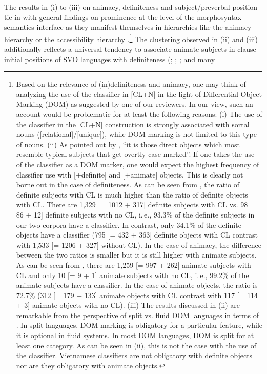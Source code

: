 \documentclass[output=paper]{langsci/langscibook}
\begin{document}
The results in (i) to (iii) on animacy, definiteness and subject/preverbal position tie in with general findings on prominence at the level of the morphosyntax-semantics interface as they manifest themselves in hierarchies like the animacy hierarchy \citep{silverstein:76,dixon:79} or the accessibility hierarchy \citep{keenan:comrie:77} \citep[for a survey, cf.][]{bornkessel:schlesewsky:09}.\footnote{Based on the relevance of (in)definiteness and animacy, one may think of analyzing the use of the classifier in [CL+N] in the light of Differential Object Marking (DOM) as suggested by one of our reviewers. In our view, such an account would be problematic for at least the following reasons: (i) The use of the classifier in the [CL+N] construction is strongly associated with sortal nouns ([\minus relational]/[\minus unique]), while DOM marking is not limited to this type of nouns. (ii) As pointed out by \cite[][439]{aissen:03}, ``it is those direct objects which most resemble typical subjects that get overtly case-marked''. If one takes the use of the classifier as a DOM marker, one would expect the highest frequency of classifier use with [+definite] and [+animate] objects. This is clearly not borne out in the case of definiteness. As can be seen from , the ratio of definite subjects with CL is much higher than the ratio of definite objects with CL. There are 1,329 [= 1012 + 317] definite subjects with CL vs. 98 [= 86 + 12] definite subjects with no CL, i.\,e., 93.3\% of the definite subjects in our two corpora have a classifier. In contrast, only 34.1\% of the definite objects have a classifier (795 [= 432 + 363] definite objects with CL contrast with 1,533 [= 1206 + 327] without CL). In the case of animacy, the difference between the two ratios is smaller but it is still higher with animate subjects. As can be seen from , there are 1,259 [= 997 + 262] animate subjects with CL and only 10 [= 9 + 1] animate subjects with no CL, i.\,e., 99.2\% of the animate subjects have a classifier. In the case of animate objects, the ratio is 72.7\% (312 [= 179 + 133] animate objects with CL contrast with 117 [= 114 + 3] animate objects with no CL). (iii) The results discussed in (ii) are remarkable from the perspective of split vs. fluid DOM languages in terms of \cite{dehoop:malchukov:07}. In split languages, DOM marking is obligatory for a particular feature, while it is optional in fluid systems. In most DOM languages, DOM is split for at least one category. As can be seen in (ii), this is not the case with the use of the classifier. Vietnamese classifiers are not obligatory with definite objects nor are they obligatory with animate objects.} The clustering observed in (ii) and (iii) additionally reflects a universal tendency to associate animate subjects in clause-initial positions of SVO languages with definiteness (\citealt{keenan:comrie:77}; \citealt{givon:79}; \citealt{dubois:87}; and many 
\end{document}

